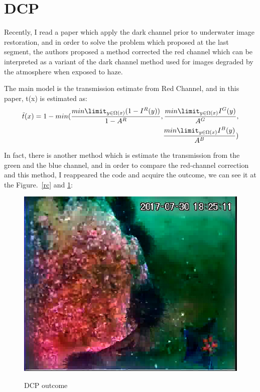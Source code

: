 \documentclass[10pt,twocolumn,letterpaper]{article}
\begin{document}
\section{DCP}
\par Recently, I read a paper which apply the dark channel prior to underwater image restoration, and in order to solve the problem which proposed at the last segment, the authors proposed a method corrected the red channel which can be interpreted as a variant of the dark channel method used for images degraded by the atmosphere when exposed to haze.
\par The main model is the transmission estimate from Red Channel, and in this paper, t(x) is estimated as:
\begin{equation}
\begin{aligned}
\tilde{t}(x) = 1-min(\frac{min\limit_{y\in\Omega(x)}(1-I^{R}(y))}{1-A^{R}}, \frac{min\limit_{y\in\Omega(x)}I^{G}(y)}{A^{G}},\\ \frac{min\limit_{y\in\Omega(x)}I^{B}(y)}{A^{B}}) 
\end{aligned}
\end{equation}
\par In fact, there is another method which is estimate the transmission from the green and the blue channel, and in order to compare the red-channel correction and this method, I reappeared the code and acquire the outcome, we can see it at the Figure.~\ref{rc} and \ref{dcp}:
\begin{figure}[htbp]
		\centering{}
		\includegraphics[width=0.9\linewidth]{dcp.jpg}\\
		\caption{DCP outcome}
		\label{dcp}
\end{figure}
\end{document}
